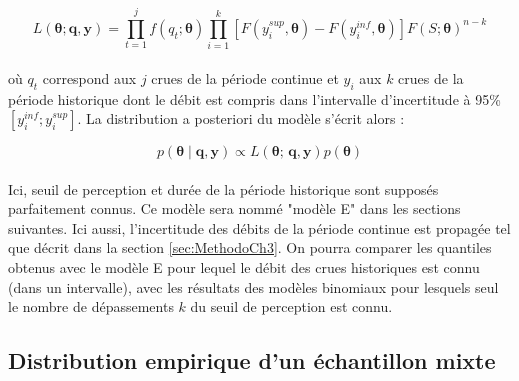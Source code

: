 		\begin{equation}
					L(\boldsymbol{\theta} ; \boldsymbol{q}, \boldsymbol{y}) =\prod_{t=1}^j f\left(q_t;\boldsymbol{\theta}\right) \prod_{i=1}^k \left[F(y_{i}^{sup},\boldsymbol{\theta} ) - F(y_i^{inf},\boldsymbol{\theta})\right]  F\left(S;\boldsymbol{\theta}\right)^{n-k}
		\label{eq:Censure}
		\end{equation}
					
		\paragraph{}où $q_t$ correspond aux $j$ crues de la période continue et $y_i$ aux $k$ crues de la période historique dont le débit est compris dans l'intervalle d'incertitude à 95\% $\left[y_i^{inf} ; y_i^{sup}\right]$. La distribution a posteriori du modèle s'écrit alors : 
				
		\begin{equation}
			p(\boldsymbol{\theta} \mid \boldsymbol{q},\boldsymbol{y}) \propto L(\boldsymbol{\theta};\,\boldsymbol{q},\boldsymbol{y})p(\boldsymbol{\theta})
		\label{eq:Bayes_Censure}
		\end{equation}

	\paragraph{} Ici, seuil de perception et durée de la période historique sont supposés parfaitement connus. Ce modèle sera nommé "modèle E" dans les sections suivantes. Ici aussi, l'incertitude des débits de la période continue est propagée tel que décrit dans la section \ref{sec:MethodoCh3}. On pourra comparer les quantiles obtenus avec le modèle E pour lequel le débit des crues historiques est connu (dans un intervalle), avec les résultats des modèles binomiaux pour lesquels seul le nombre de dépassements $k$ du seuil de perception est connu.
	

	\subsection{Distribution empirique d'un échantillon mixte}
	\label{subsec:DistEmpirique}
	
